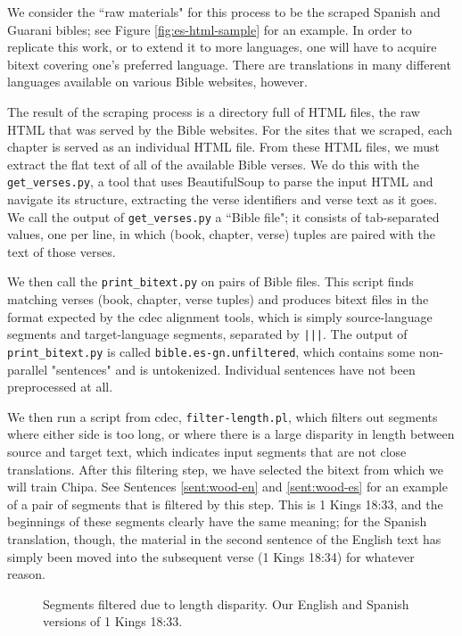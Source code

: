 We consider the ``raw materials" for this process to be the scraped Spanish and
Guarani bibles; see Figure \ref{fig:es-html-sample} for an example.  In order
to replicate this work, or to extend it to more languages, one will have to
acquire bitext covering one's preferred language. There are translations in
many different languages available on various Bible websites, however.

The result of the scraping process is a directory full of HTML files, the raw
HTML that was served by the Bible websites. For the sites that we scraped, each
chapter is served as an individual HTML file. From these HTML files, we must
extract the flat text of all of the available Bible verses.  We do this with
the \texttt{get\_verses.py}, a tool that uses BeautifulSoup to parse the input
HTML and navigate its structure, extracting the verse identifiers and verse
text as it goes. We call the output of \texttt{get\_verses.py} a ``Bible file";
it consists of tab-separated values, one per line, in which (book, chapter,
verse) tuples are paired with the text of those verses.

We then call the \texttt{print\_bitext.py} on pairs of Bible files. This script
finds matching verses (book, chapter, verse tuples) and produces bitext files
in the format expected by the cdec alignment tools, which is simply
source-language segments and target-language segments, separated by
\texttt{|||}. The output of \texttt{print\_bitext.py} is called
\texttt{bible.es-gn.unfiltered}, which contains some non-parallel "sentences"
and is untokenized. Individual sentences have not been preprocessed at all.

We then run a script from cdec, \texttt{filter-length.pl}, which filters
out segments where either side is too long, or where there is a large disparity
in length between source and target text, which indicates input segments that
are not close translations. After this filtering step, we have selected the
bitext from which we will train Chipa. See Sentences \ref{sent:wood-en} and
\ref{sent:wood-es} for an example of a pair of segments that is filtered by
this step. This is 1 Kings 18:33, and the beginnings of these segments clearly
have the same meaning; for the Spanish translation, though, the material in the
second sentence of the English text has simply been moved into the subsequent
verse (1 Kings 18:34) for whatever reason.

\begin{figure}
\label{sent:wood-en}
\label{sent:wood-es}
  \caption{Segments filtered due to length disparity. Our English and Spanish
  versions of 1 Kings 18:33.}
  \label{fig:length-disparity}
\end{figure}

